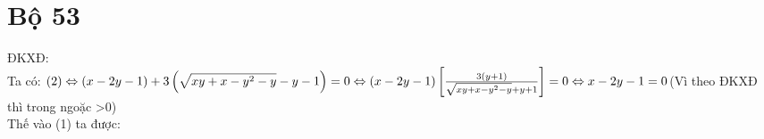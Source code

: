 \section{Bộ 53}
\hda 
ĐKXĐ:\\ 
Ta có: $(2)\Leftrightarrow (x-2y-1)+3\left ( \sqrt{xy+x-y^{2}-y}-y-1 \right )=0\\
\Leftrightarrow (x-2y-1)\left [ \frac{3(y+1)}{\sqrt{xy+x-y^{2}-y}+y+1} \right ]=0\\
\Leftrightarrow x-2y-1=0$\hspace{5mm}(Vì theo ĐKXĐ thì trong ngoặc >0)\\
Thế vào (1) ta được:\\

